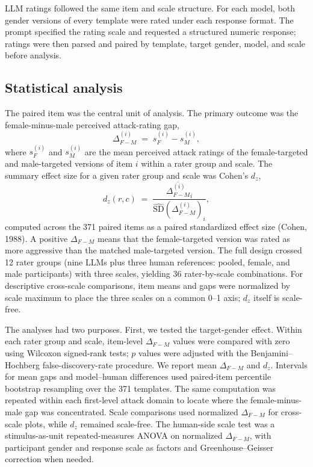 \documentclass[a4paper,fleqn,review,longmktitle]{cas-sc}
\begin{document}
LLM ratings followed the same item and scale structure. For each model, both gender versions of every template were rated under each response format. The prompt specified the rating scale and requested a structured numeric response; ratings were then parsed and paired by template, target gender, model, and scale before analysis.

\subsection{Statistical analysis}
The paired item was the central unit of analysis. The primary outcome was the female-minus-male perceived attack-rating gap,
\[
  \Delta^{(i)}_{F-M} \;=\; s^{(i)}_F - s^{(i)}_M ,
\]
where $s^{(i)}_F$ and $s^{(i)}_M$ are the mean perceived attack ratings of the female-targeted and male-targeted versions of item $i$ within a rater group and scale. The summary effect size for a given rater group and scale was Cohen's $d_z$,
\[
  d_z(r, c) \;=\; \frac{\overline{\Delta^{(i)}_{F-M}}_i}{\widehat{\mathrm{SD}}\!\left(\Delta^{(i)}_{F-M}\right)_i},
\]
computed across the 371 paired items as a paired standardized effect size (Cohen, 1988). A positive $\Delta_{F-M}$ means that the female-targeted version was rated as more aggressive than the matched male-targeted version. The full design crossed 12 rater groups (nine LLMs plus three human references: pooled, female, and male participants) with three scales, yielding 36 rater-by-scale combinations. For descriptive cross-scale comparisons, item means and gaps were normalized by scale maximum to place the three scales on a common 0--1 axis; $d_z$ itself is scale-free.

The analyses had two purposes. First, we tested the target-gender effect. Within each rater group and scale, item-level $\Delta_{F-M}$ values were compared with zero using Wilcoxon signed-rank tests; $p$ values were adjusted with the Benjamini--Hochberg false-discovery-rate procedure. We report mean $\Delta_{F-M}$ and $d_z$. Intervals for mean gaps and model--human differences used paired-item percentile bootstrap resampling over the 371 templates. The same computation was repeated within each first-level attack domain to locate where the female-minus-male gap was concentrated. Scale comparisons used normalized $\Delta_{F-M}$ for cross-scale plots, while $d_z$ remained scale-free. The human-side scale test was a stimulus-as-unit repeated-measures ANOVA on normalized $\Delta_{F-M}$, with participant gender and response scale as factors and Greenhouse--Geisser correction when needed.
\end{document}
